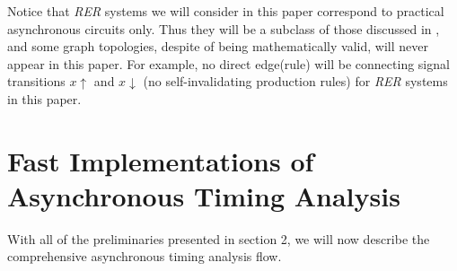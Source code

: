 \documentclass[sigconf, 10pt, twocolumn]{acmart}
\begin{document}
Notice that {\it RER\/} systems we will consider in this paper correspond to practical asynchronous circuits only. Thus they will be a subclass of those discussed in \cite{Hua:Exact}, and some graph topologies, despite of being mathematically valid, will never appear in this paper. For example, no direct edge(rule) will be connecting signal transitions $x\uparrow$ and $x\downarrow$ (no self-invalidating production rules) for {\it RER\/} systems in this paper.
\section{Fast Implementations of Asynchronous Timing Analysis}
With all of the preliminaries presented in section 2, we will now describe the comprehensive asynchronous timing analysis flow.
\end{document}

